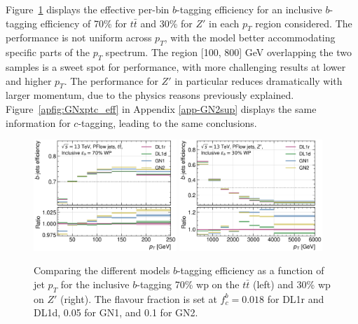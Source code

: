 Figure~\ref{fig:GNxptb_eff} displays the effective per-bin $b$-tagging efficiency for an inclusive $b$-tagging efficiency of 70\% for $t\bar{t}$ and 30\% for $Z'$ in each $p_T$ region considered. The performance is not uniform across $p_T$, with the model better accommodating specific parts of the $p_T$ spectrum. The region [100, 800] GeV overlapping the two samples is a sweet spot for performance, with more challenging results at lower and higher $p_T$. The performance for $Z'$ in particular reduces dramatically with larger momentum, due to the physics reasons previously explained. Figure~\ref{apfig:GNxptc_eff} in Appendix \ref{app-GN2sup} displays the same information for $c$-tagging, leading to the same conclusions. \\
\begin{figure}[h!]
  \centering
  \includegraphics[width=0.48\textwidth]{Images/FTAG/GN/GN2/pt_plots/pt_ttbar_b_eff.png}
  \includegraphics[width=0.48\textwidth]{Images/FTAG/GN/GN2/pt_plots/pt_zp_b_eff.png}
  \caption{Comparing the different models $b$-tagging efficiency as a function of jet $p_T$ for the inclusive $b$-tagging 70\% \gls{wp} on the $t\bar{t}$ (left) and 30\% \gls{wp} on $Z'$ (right). The flavour fraction is set at $f^b_c = 0.018$ for DL1r and DL1d, 0.05 for GN1, and 0.1 for GN2.}
  \label{fig:GNxptb_eff}
\end{figure} 
